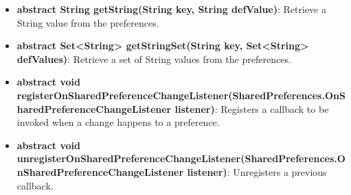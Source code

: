 \documentclass{report}
\begin{document}
\begin{itemize}
\begin{itemize}
                \item \textbf{abstract String	getString(String key, String defValue)}: Retrieve a String value from the preferences.
                \item \textbf{abstract Set<String>	getStringSet(String key, Set<String> defValues)}: Retrieve a set of String values from the preferences.
                \item \textbf{abstract void	registerOnSharedPreferenceChangeListener(SharedPreferences.OnSharedPreferenceChangeListener listener)}: Registers a callback to be invoked when a change happens to a preference.
                \item \textbf{abstract void	unregisterOnSharedPreferenceChangeListener(SharedPreferences.OnSharedPreferenceChangeListener listener)}: Unregisters a previous callback.
            \end{itemize}
    \end{itemize}

    \pagebreak 
\end{document}
